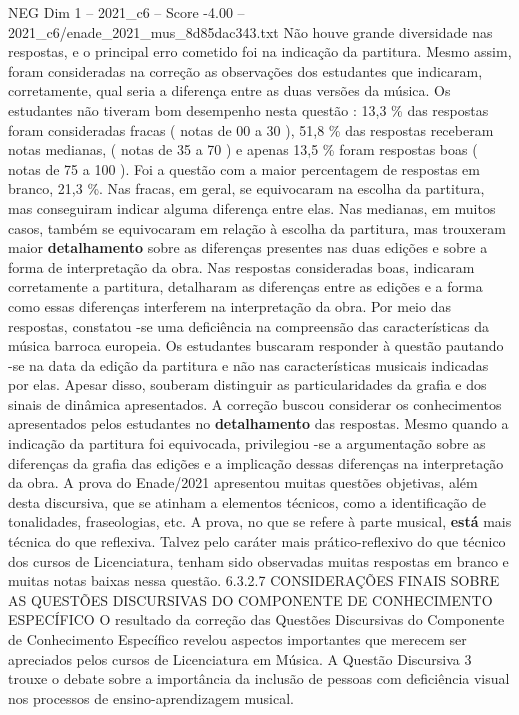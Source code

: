 \begin{textsample}{NEG Dim 1 – 2021\_c6 – Score -4.00 – 2021\_c6/enade\_2021\_mus\_8d85dac343.txt}
Não houve grande diversidade nas respostas, e o principal erro cometido foi na indicação da partitura.
Mesmo assim, foram consideradas na correção as observações dos estudantes que indicaram, corretamente, qual seria a diferença entre as duas versões da música.
Os estudantes não tiveram bom desempenho nesta questão : 13,3 \% das respostas foram consideradas fracas ( notas de 00 a 30 ), 51,8 \% das respostas receberam notas medianas, ( notas de 35 a 70 ) e apenas 13,5 \% foram respostas boas ( notas de 75 a 100 ).
Foi a questão com a maior percentagem de respostas em branco, 21,3 \%.
Nas fracas, em geral, se equivocaram na escolha da partitura, mas conseguiram indicar alguma diferença entre elas.
Nas medianas, em muitos casos, também se equivocaram em relação à escolha da partitura, mas trouxeram maior \textbf{detalhamento} sobre as diferenças presentes nas duas edições e sobre a forma de interpretação da obra.
Nas respostas consideradas boas, indicaram corretamente a partitura, detalharam as diferenças entre as edições e a forma como essas diferenças interferem na interpretação da obra.
Por meio das respostas, constatou -se uma deficiência na compreensão das características da música barroca europeia.
Os estudantes buscaram responder à questão pautando -se na data da edição da partitura e não nas características musicais indicadas por elas.
Apesar disso, souberam distinguir as particularidades da grafia e dos sinais de dinâmica apresentados.
A correção buscou considerar os conhecimentos apresentados pelos estudantes no \textbf{detalhamento} das respostas.
Mesmo quando a indicação da partitura foi equivocada, privilegiou -se a argumentação sobre as diferenças da grafia das edições e a implicação dessas diferenças na interpretação da obra.
A prova do Enade/2021 apresentou muitas questões objetivas, além desta discursiva, que se atinham a elementos técnicos, como a identificação de tonalidades, fraseologias, etc.
A prova, no que se refere à parte musical, \textbf{está} mais técnica do que reflexiva.
Talvez pelo caráter mais prático-reflexivo do que técnico dos cursos de Licenciatura, tenham sido observadas muitas respostas em branco e muitas notas baixas nessa questão. 6.3.2.7 CONSIDERAÇÕES FINAIS SOBRE AS QUESTÕES DISCURSIVAS DO COMPONENTE DE CONHECIMENTO ESPECÍFICO O resultado da correção das Questões Discursivas do Componente de Conhecimento Específico revelou aspectos importantes que merecem ser apreciados pelos cursos de Licenciatura em Música.
A Questão Discursiva 3 trouxe o debate sobre a importância da inclusão de pessoas com deficiência visual nos processos de ensino-aprendizagem musical.

\end{textsample}
